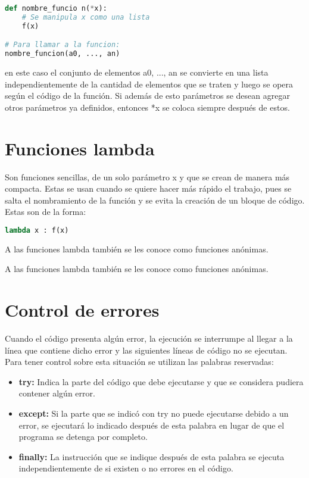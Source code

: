 \documentclass[10pt,oneside]{article}
\begin{document}
\begin{multicols}{2}
                \begin{lstlisting}[language=Python]
def nombre_funcio n(*x):
    # Se manipula x como una lista
    f(x)

# Para llamar a la funcion:
nombre_funcion(a0, ..., an)
                \end{lstlisting}

                en este caso el conjunto de elementos a0, ..., an se convierte en una lista independientemente de la cantidad de elementos que se traten y luego se opera según el código de la función. Si además de esto parámetros se desean agregar otros parámetros ya definidos, entonces *x se coloca siempre después de estos.
                
                
            \section{Funciones lambda} Son funciones sencillas, de un solo parámetro x y que se crean de manera más compacta. Estas se usan cuando se quiere hacer más rápido el trabajo, pues se salta el nombramiento de la función y se evita la creación de un bloque de código. Estas son de la forma:

                \begin{lstlisting}[language=Python]
lambda x : f(x)
                \end{lstlisting}

            A las funciones lambda también se les conoce como funciones anónimas.

            A las funciones lambda también se les conoce como funciones anónimas.
            
            \section{Control de errores}

            Cuando el código presenta algún error, la ejecución se interrumpe al llegar a la línea que contiene dicho error y las siguientes líneas de código no se ejecutan. Para tener control sobre esta situación se utilizan las palabras reservadas:

            \begin{itemize}
                \item \textbf{try:} Indica la parte del código que debe ejecutarse y que se considera pudiera contener algún error.
                \item \textbf{except:} Si la parte que se indicó con try no puede ejecutarse debido a un error, se ejecutará lo indicado después de esta palabra en lugar de que el programa se detenga por completo.
                \item \textbf{finally:} La instrucción que se indique después de esta palabra se ejecuta independientemente de si existen o no errores en el código.
            \end{itemize}
            

\end{multicols}
\end{document}
